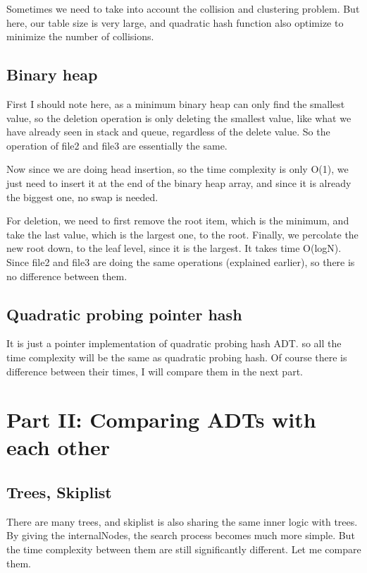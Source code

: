 \documentclass[]{article}
\begin{document}
Sometimes we need to take into account the collision and clustering
problem. But here, our table size is very large, and quadratic hash
function also optimize to minimize the number of collisions.

\subsection{Binary heap}\label{binary-heap}

First I should note here, as a minimum binary heap can only find the
smallest value, so the deletion operation is only deleting the smallest
value, like what we have already seen in stack and queue, regardless of
the delete value. So the operation of file2 and file3 are essentially
the same.

Now since we are doing head insertion, so the time complexity is only
O(1), we just need to insert it at the end of the binary heap array, and
since it is already the biggest one, no swap is needed.

For deletion, we need to first remove the root item, which is the
minimum, and take the last value, which is the largest one, to the root.
Finally, we percolate the new root down, to the leaf level, since it is
the largest. It takes time O(logN). Since file2 and file3 are doing the
same operations (explained earlier), so there is no difference between
them.

\subsection{Quadratic probing pointer
hash}\label{quadratic-probing-pointer-hash}

It is just a pointer implementation of quadratic probing hash ADT. so
all the time complexity will be the same as quadratic probing hash. Of
course there is difference between their times, I will compare them in
the next part.

\section{Part II: Comparing ADTs with each
other}\label{part-ii-comparing-adts-with-each-other}

\subsection{Trees, Skiplist}\label{trees-skiplist}

There are many trees, and skiplist is also sharing the same inner logic
with trees. By giving the internalNodes, the search process becomes much
more simple. But the time complexity between them are still
significantly different. Let me compare them.
\end{document}
